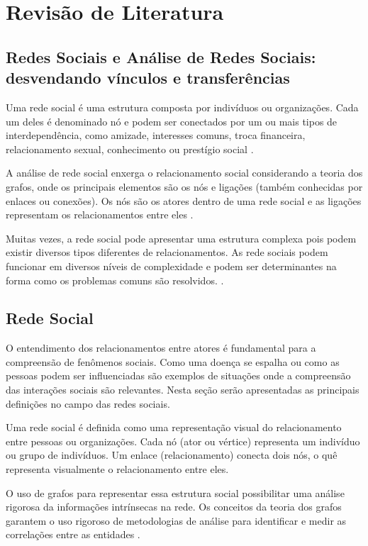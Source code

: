 \chapter{Revisão de Literatura}
\label{sec:revisao}

\section{Redes Sociais e Análise de Redes Sociais: desvendando vínculos e transferências}

Uma rede social é uma estrutura composta por indivíduos ou organizações. Cada um deles é denominado nó e podem ser conectados por um ou mais tipos de interdependência, como amizade, interesses comuns, troca financeira, relacionamento sexual, conhecimento ou prestígio social \cite{kadushin2005benefits}.

A análise de rede social enxerga o relacionamento social considerando a teoria dos grafos, onde os principais elementos são os nós e ligações (também conhecidas por enlaces ou conexões). Os nós são os atores dentro de uma rede social e as ligações representam os relacionamentos entre eles \cite{kadushin2005benefits}.

Muitas vezes, a rede social pode apresentar uma estrutura complexa pois podem existir diversos tipos diferentes de relacionamentos. As rede sociais podem funcionar em diversos níveis de complexidade e podem ser determinantes na forma como os problemas comuns são resolvidos. \cite{stanley1994social}.

\section{Rede Social}
O entendimento dos relacionamentos entre atores é fundamental para a compreensão de fenômenos sociais. Como uma doença se espalha ou como as pessoas podem ser influenciadas são exemplos de situações onde a compreensão das interações sociais são relevantes. Nesta seção serão apresentadas as principais definições no campo das redes sociais.

Uma rede social é definida como uma representação visual do relacionamento entre pessoas ou organizações. Cada nó (ator ou vértice) representa um indivíduo ou grupo de indivíduos. Um enlace (relacionamento) conecta dois nós, o quê representa visualmente o relacionamento entre eles.

O uso de grafos para representar essa estrutura social possibilitar uma análise rigorosa da informações intrínsecas na rede. Os conceitos da teoria dos grafos garantem o uso rigoroso de metodologias de análise para identificar e medir as correlações entre as entidades \cite{pan2007effective}.

